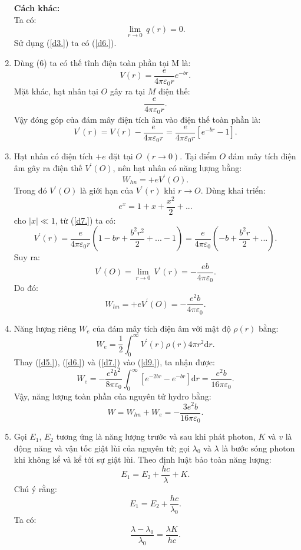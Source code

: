 \begin{loigiai}
\begin{enumerate}[1)]
\textbf{Cách khác:} \\Ta có: \[\underset{r\to 0}{\mathop{\lim }}\,q(r)=0.\] Sử dụng (\ref{d3.}) ta có (\ref{d6.}).
\item Dùng (6) ta có thế tĩnh điện toàn phần tại M là:
	\[V(r)=\dfrac{e}{4\pi {{\varepsilon }_{0}}r}{{e}^{-br}}.\]
Mặt khác, hạt nhân tại $O$ gây ra tại $M$ điện thế: \[\dfrac{e}{4\pi {{\varepsilon }_{0}}r}.\] 
Vậy đóng góp của đám mây điện tích âm vào điện thế toàn phần là:
		\[{{V}^{'}}(r)=V(r)-\dfrac{e}{4\pi {{\varepsilon }_{0}}r}=\dfrac{e}{4\pi {{\varepsilon }_{0}}r}\left[ {{e}^{-br}}-1 \right]. \tag{7} \label{d7.}\]		
\item  Hạt nhân có điện tích $+e$ đặt tại $O$ $(r\to 0)$. Tại điểm $O$ đám mây tích điện âm gây ra điện thế ${{V}^{'}}(O)$, nên hạt nhân có năng lượng bằng:
		\[{{{W}}_{hn}}=+e{{V}^{'}}(O).\]
Trong đó ${{V}^{'}}(O)$ là giới hạn của ${{V}^{'}}(r)$ khi $r \to O$. Dùng khai triển:
\[{{e}^{x}}=1+x+\dfrac{{{x}^{2}}}{2}+...\]
cho $\left| x \right| \ll 1$, từ (\ref{d7.}) ta có:
	\[{{V}^{'}}(r)=\dfrac{e}{4\pi {{\varepsilon }_{0}}r}\left( 1-br+\dfrac{{{b}^{2}}{{r}^{2}}}{2}+...-1 \right)=\dfrac{e}{4\pi {{\varepsilon }_{0}}}\left( -b+\dfrac{{{b}^{2}}r}{2}+... \right).\]
Suy ra: 	\[{{V}^{'}}(O)=\underset{r\to 0}{\mathop{\lim }}\,{{V}^{'}}(r)=-\dfrac{eb}{4\pi {{\varepsilon }_{0}}}.\]
Do đó: 	\[{{{W}}_{hn}}=+e{{V}^{'}}(O)=-\dfrac{{{e}^{2}}b}{4\pi {{\varepsilon }_{0}}}. \tag{8} \label{d8.}\]			                      
\item Năng lượng riêng $W_e$ của đám mây tích điện âm với mật độ $\rho (r)$ bằng:
	\[{{{W}}_{e}}=\dfrac{1}{2}\int_{0}^{\infty }{{{V}^{'}}(r)\rho (r)4\pi {{r}^{2}}\mathrm{d}r}. \tag{9} \label{d9.}\]			                   
Thay (\ref{d5.}), (\ref{d6.}) và (\ref{d7.}) vào (\ref{d9.}), ta nhận được:
	\[{{{W}}_{e}}=-\dfrac{{{e}^{2}}{{b}^{2}}}{8\pi {{\varepsilon }_{0}}}\int_{0}^{\infty }{\left[ {{e}^{-2br}}-{{e}^{-br}} \right]\mathrm{d}r}=\dfrac{{{e}^{2}}b}{16\pi {{\varepsilon }_{0}}}.\]
Vậy, năng lượng toàn phần của nguyên tử hydro bằng:
	\[{W}={{{W}}_{hn}}+{{{W}}_{e}}=-\dfrac{3{{e}^{2}}b}{16\pi {{\varepsilon }_{0}}} \tag{10} \label{d10.}.\]				      
   \item Gọi $E_1$, $E_2$ tương ứng là năng lượng trước và sau khi phát photon, $K$ và $v$ là động năng và vận tốc giật lùi của nguyên tử; gọi $\lambda_0$ và $\lambda$ là bước sóng photon khi không kể và kể tới sự giật lùi. Theo định luật bảo toàn năng lượng:
                      \[ E_1=E_2 + \dfrac{hc}{\lambda} +K.\]
        Chú ý rằng:   \[ E_1 = E_2 + \dfrac{hc}{\lambda_0}.\]
       Ta có: \[\dfrac{\lambda-\lambda_{0}}{\lambda_{0}}=\dfrac{\lambda K}{hc}. \tag{11} \label{d11.}\]
                                

\end{enumerate}
\end{loigiai}
